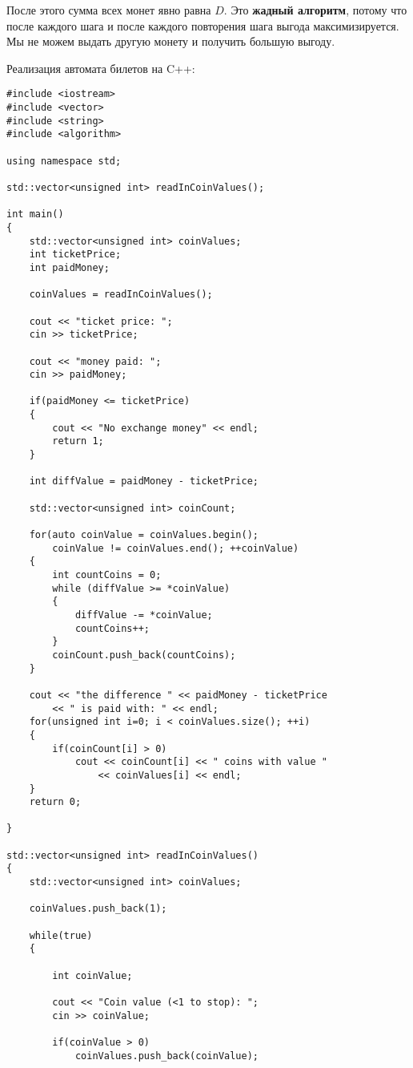\vspace{\baselineskip}

После этого сумма всех монет явно равна $D$. Это \textbf{жадный алгоритм}, потому что после каждого шага и после каждого повторения шага выгода максимизируется. Мы не можем выдать другую монету и получить большую выгоду.

Реализация автомата билетов на C++:

\begin{tcolorbox}
\begin{verbatim}
#include <iostream>
#include <vector>
#include <string>
#include <algorithm>

using namespace std;

std::vector<unsigned int> readInCoinValues();

int main()
{
	std::vector<unsigned int> coinValues;
	int ticketPrice;
	int paidMoney;
	
	coinValues = readInCoinValues();
	
	cout << "ticket price: ";
	cin >> ticketPrice;
	
	cout << "money paid: ";
	cin >> paidMoney;
	
	if(paidMoney <= ticketPrice)
	{
		cout << "No exchange money" << endl;
		return 1;
	}
	
	int diffValue = paidMoney - ticketPrice;
	
	std::vector<unsigned int> coinCount;
	
	for(auto coinValue = coinValues.begin();
		coinValue != coinValues.end(); ++coinValue)
	{
		int countCoins = 0;
		while (diffValue >= *coinValue)
		{
			diffValue -= *coinValue;
			countCoins++;
		}
		coinCount.push_back(countCoins);
	}
	
	cout << "the difference " << paidMoney - ticketPrice
		<< " is paid with: " << endl;
	for(unsigned int i=0; i < coinValues.size(); ++i)
	{
		if(coinCount[i] > 0)
			cout << coinCount[i] << " coins with value "
				<< coinValues[i] << endl;
	}
	return 0;

}

std::vector<unsigned int> readInCoinValues()
{
	std::vector<unsigned int> coinValues;
	
	coinValues.push_back(1);
	
	while(true)
	{
		
		int coinValue;
		
		cout << "Coin value (<1 to stop): ";
		cin >> coinValue;
		
		if(coinValue > 0)
			coinValues.push_back(coinValue);
		

\end{verbatim}
\end{tcolorbox}

